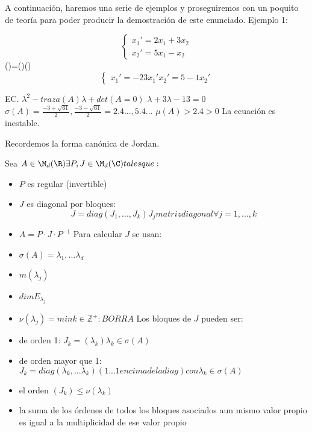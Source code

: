 A continuación, haremos una serie de ejemplos y proseguiremos con un poquito de teoría para poder producir la demostración de este enunciado.
Ejemplo 1:
{
\begin{equation}
\left\{\begin{array}{lcl}
x_1'=2x_1+3x_2\\
x_2'=5x_1-x_2
\end{array}\right.
\end{equation}
()=()()
\begin{equation}
\left\{\begin{array}{lcl}
x_1' = -2 3   x_1'
x_2'= 5 -1    x_2'
\end{array}\right.
\end{equation}

EC. $\lambda^2-traza(A)\lambda + det(A=0)$
$\lambda+3\lambda-13=0$
$\sigma(A)={\frac{-3+\sqrt{61}}{2},\frac{-3-\sqrt{61}}{2}}={2.4...,5.4...}$
$\mu(A)>2.4 >0$
La ecuación es inestable.



Recordemos la forma canónica de Jordan.

Sea $A \in \M_d(\R) \exists P, J \in \M_d(\C) tales que:$
\begin{itemize}
\item $P$ es regular (invertible)
\item $J$ es diagonal por bloques:
\begin{equation}
J=diag(J_1,...,J_k) J_j matriz diagonal \forall j=1,...,k
\end{equation}
\item $A=P\cdot J\cdot P^{-1}$
Para calcular $J$ se usan:
\item $\sigma(A)={\lambda_1,...\lambda_d}$
\item $m(\lambda_j)$
\item $dim E_{\lambda_j}$
\item $\nu(\lambda_j)=min{k\in\mathbb{Z}^+: BORRA}$
Los bloques de $J$ pueden ser:
\item de orden 1: $J_k=(\lambda_k) \lambda_k \in \sigma(A)$
\item de orden mayor que 1: $J_k=diag(\lambda_k,...\lambda_k) (1...1 encima de la diag) con \lambda_k \in \sigma(A)$
\item el orden $(J_k) \leq \nu(\lambda_k)$
\item la suma de los órdenes de todos los bloques asociados aun mismo valor propio es igual a la multiplicidad de ese valor propio
\end{itemize}

}
